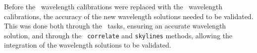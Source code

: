 Before the \polsalt\ wavelength calibrations were replaced with the \iraf\ wavelength calibrations, the accuracy of the new wavelength solutions needed to be validated. This was done both through the \iraf\ tasks, ensuring an accurate wavelength solution, and through the \stops\ \texttt{correlate} and \texttt{skylines} methods, allowing the integration of the wavelength solutions to be validated.








